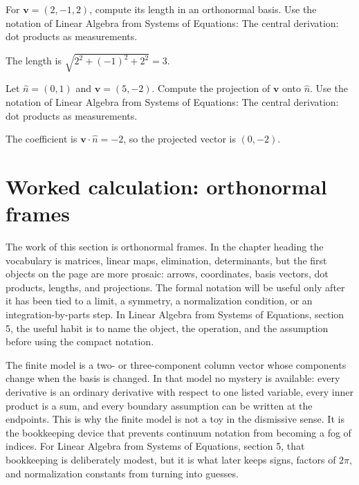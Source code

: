 \begin{exercise}
For \(\bm v=(2,-1,2)\), compute its length in an orthonormal basis.  Use the notation of Linear Algebra from Systems of Equations: The central derivation: dot products as measurements.
\begin{answer}
The length is \(\sqrt{2^2+(-1)^2+2^2}=3\).
\end{answer}
\end{exercise}

\begin{exercise}
Let \(\hat n=(0,1)\) and \(\bm v=(5,-2)\).  Compute the projection of \(\bm v\) onto \(\hat n\).  Use the notation of Linear Algebra from Systems of Equations: The central derivation: dot products as measurements.
\begin{answer}
The coefficient is \(\bm v\cdot\hat n=-2\), so the projected vector is \((0,-2)\).
\end{answer}
\end{exercise}



\section{Worked calculation: orthonormal frames}

The work of this section is orthonormal frames.  In the chapter heading the vocabulary is matrices, linear maps, elimination, determinants, but the first objects on the page are more prosaic: arrows, coordinates, basis vectors, dot products, lengths, and projections.  The formal notation will be useful only after it has been tied to a limit, a symmetry, a normalization condition, or an integration-by-parts step.  In Linear Algebra from Systems of Equations, section 5, the useful habit is to name the object, the operation, and the assumption before using the compact notation.

The finite model is a two- or three-component column vector whose components change when the basis is changed.  In that model no mystery is available: every derivative is an ordinary derivative with respect to one listed variable, every inner product is a sum, and every boundary assumption can be written at the endpoints.  This is why the finite model is not a toy in the dismissive sense.  It is the bookkeeping device that prevents continuum notation from becoming a fog of indices.  For Linear Algebra from Systems of Equations, section 5, that bookkeeping is deliberately modest, but it is what later keeps signs, factors of \(2\pi\), and normalization constants from turning into guesses.

